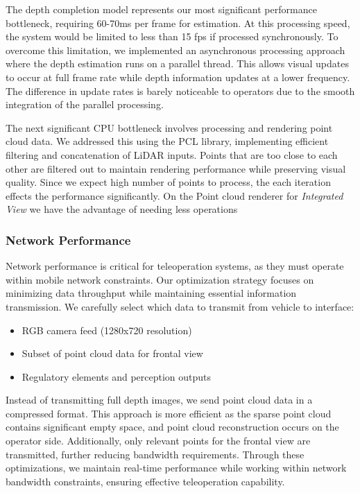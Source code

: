 The depth completion model represents our most significant performance bottleneck, requiring 60-70ms per frame for estimation. At this processing speed, the system would be limited to less than 15 fps if processed synchronously. To overcome this limitation, we implemented an asynchronous processing approach where the depth estimation runs on a parallel thread. This allows visual updates to occur at full frame rate while depth information updates at a lower frequency. The difference in update rates is barely noticeable to operators due to the smooth integration of the parallel processing.

The next significant CPU bottleneck involves processing and rendering point cloud data. We addressed this using the PCL library, implementing efficient filtering and concatenation of \ac{LiDAR} inputs. Points that are too close to each other are filtered out to maintain rendering performance while preserving visual quality.
Since we expect high number of points to process, the each iteration effects the performance significantly. On the Point cloud renderer for \emph{Integrated View} we have the advantage of needing less operations

\subsubsection{Network Performance}
Network performance is critical for teleoperation systems, as they must operate within mobile network constraints. Our optimization strategy focuses on minimizing data throughput while maintaining essential information transmission.
We carefully select which data to transmit from vehicle to interface:
\begin{itemize}
\item RGB camera feed (1280x720 resolution)
\item Subset of point cloud data for frontal view
\item Regulatory elements and perception outputs
\end{itemize}
Instead of transmitting full depth images, we send point cloud data in a compressed format. This approach is more efficient as the sparse point cloud contains significant empty space, and point cloud reconstruction occurs on the operator side. Additionally, only relevant points for the frontal view are transmitted, further reducing bandwidth requirements.
Through these optimizations, we maintain real-time performance while working within network bandwidth constraints, ensuring effective teleoperation capability.
